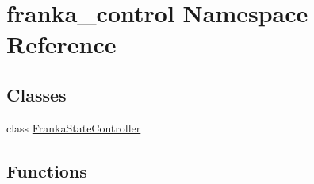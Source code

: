 \hypertarget{namespacefranka__control}{}\section{franka\+\_\+control Namespace Reference}
\label{namespacefranka__control}
\subsection*{Classes}
\begin{DoxyCompactItemize}
\item 
class \hyperlink{classfranka__control_1_1FrankaStateController}{Franka\+State\+Controller}
\end{DoxyCompactItemize}
\subsection*{Functions}
